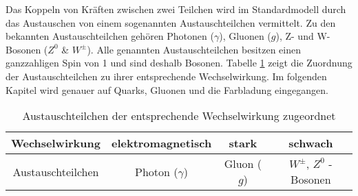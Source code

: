 Das Koppeln von Kr\"aften zwischen zwei Teilchen wird im Standardmodell durch das Austauschen von einem sogenannten Austauschteilchen vermittelt.
Zu den bekannten Austauschteilchen geh\"oren Photonen ($\gamma$), Gluonen ($g$), Z- und W-Bosonen ($Z^{0}$ \& $W^{\pm}$).
Alle genannten Austauschteilchen besitzen einen ganzzahligen Spin von 1 und sind deshalb Bosonen.
Tabelle \ref{tab:Austeilchen} zeigt die Zuordnung der Austauschteilchen zu ihrer entsprechende Wechselwirkung.
Im folgenden Kapitel wird genauer auf Quarks, Gluonen und die Farbladung eingegangen.

\begin{table}[h]
\centering
\begin{tabular}{|c||c|c|c|}
\hline
Wechselwirkung    & elektromagnetisch & stark       & schwach                      \\ \hline
Austauschteilchen & Photon ($\gamma$) & Gluon ($g$) & $W^{\pm}$, $Z^{0}$ - Bosonen \\ \hline
\end{tabular}
\caption{Austauschteilchen der entsprechende Wechselwirkung zugeordnet}
\label{tab:Austeilchen}
\end{table}
